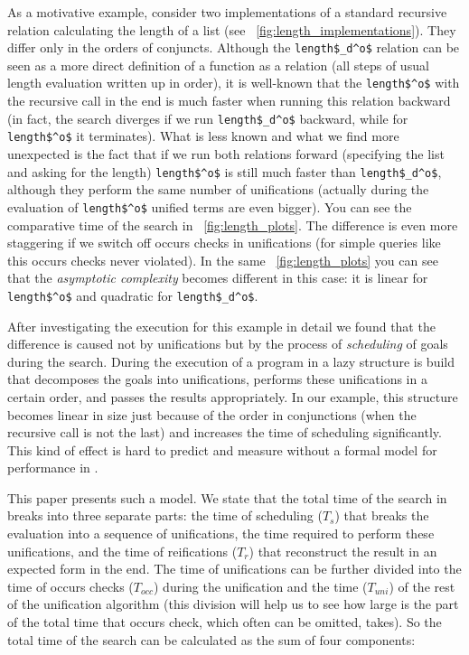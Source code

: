 As a motivative example, consider two implementations of a standard recursive relation calculating the length of a list (see \figureword~\ref{fig:length_implementations}). They differ only in the
orders of conjuncts. Although the \lstinline|length$_d^o$| relation can be seen as a more direct definition of a function as a relation (all steps of usual length evaluation written up in order),
it is well-known that the \lstinline|length$^o$| with the recursive call in the end is much faster when running this relation backward (in fact, the search diverges if we
run \lstinline|length$_d^o$| backward, while for \lstinline|length$^o$| it terminates). What is less known and what we find more unexpected is the fact that if we run both relations
forward (specifying the list and asking for the length) \lstinline|length$^o$| is still much faster than \lstinline|length$_d^o$|, although they perform the same number of unifications
(actually during the evaluation of \lstinline|length$^o$| unified terms are even bigger). You can see the comparative time of the search in \figureword~\ref{fig:length_plots}. The difference is even
more staggering if we switch off occurs checks in unifications (for simple queries like this occurs checks never violated). In the same \figureword~\ref{fig:length_plots} you can see that
the \emph{asymptotic complexity} becomes different in this case: it is linear for \lstinline|length$^o$| and quadratic for \lstinline|length$_d^o$|.

After investigating the execution for this example in detail we found that the difference is caused not by unifications but by the process of \emph{scheduling} of goals during the search.
During the execution of a program in \mK a lazy structure is build that decomposes the goals into unifications, performs these unifications in a certain order, and passes the results
appropriately. In our example, this structure becomes linear in size just because of the order in conjunctions (when the recursive call is not the last) and increases the time of
scheduling significantly. This kind of effect is hard to predict and measure without a formal model for performance in \mK.

This paper presents such a model. We state that the total time of the search in \mK breaks into three separate parts: the time of scheduling ($T_s$) that breaks the evaluation into a sequence of
unifications, the time required to perform these unifications, and the time of reifications ($T_r$) that reconstruct the result in an expected form in the end. The time of unifications can be further
divided into the time of occurs checks ($T_{occ}$) during the unification and the time ($T_{uni}$) of the rest of the unification algorithm (this division will help us to see how large
is the part of the total time that occurs check, which often can be omitted, takes). So the total time of the search can be calculated as the sum of four components:

